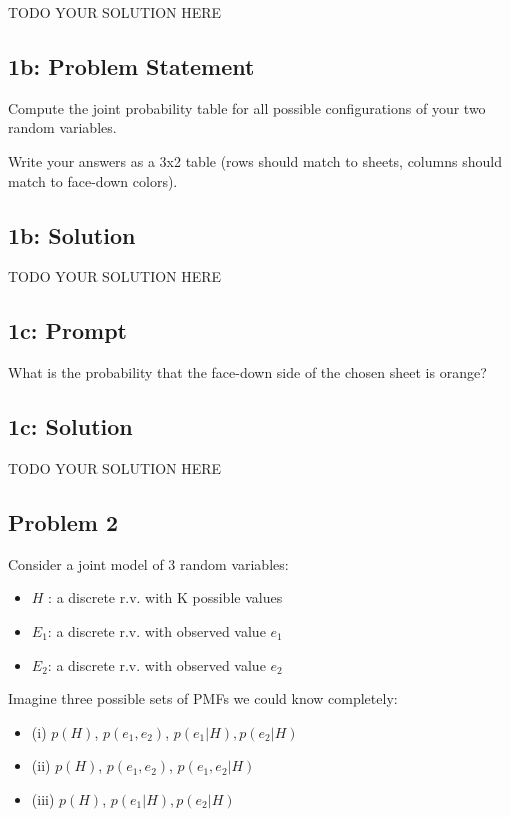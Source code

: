 \documentclass[10pt]{article}
\newcommand{\officialdirections}[1]{{\color{purple} #1}}
\begin{document}
TODO YOUR SOLUTION HERE

\officialdirections{
\subsection*{1b: Problem Statement}
Compute the joint probability table for all possible configurations of your two random variables.

Write your answers as a 3x2 table (rows should match to sheets, columns should match to face-down colors).
}

\subsection{1b: Solution}

TODO YOUR SOLUTION HERE

\officialdirections{
\subsection*{1c: Prompt}
What is the probability that the face-down side of the chosen sheet is orange?
}
\subsection{1c: Solution}

TODO YOUR SOLUTION HERE

\officialdirections{
\subsection*{Problem 2}

Consider a joint model of 3 random variables:

\begin{itemize}
\item $H$ : a discrete r.v. with K possible values
\item $E_1$: a discrete r.v. with observed value $e_1$
\item $E_2$: a discrete r.v. with observed value $e_2$
\end{itemize}

Imagine three possible sets of PMFs we could know completely:

\begin{itemize}
\item (i) $p(H)$, $p(e_1, e_2)$, $p(e_1|H), p(e_2|H)$
\item (ii) $p(H)$, $p(e_1, e_2)$, $p(e_1, e_2|H)$
\item (iii) $p(H)$, $p(e_1|H), p(e_2|H)$
\end{itemize}
}
\end{document}

